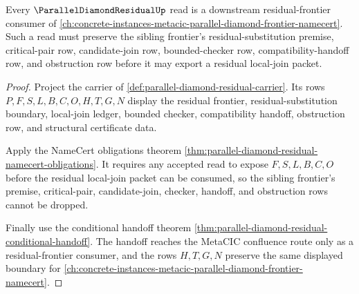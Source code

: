\begin{theorem}
\label{thm:parallel-diamond-residual-metacic-sibling-route}
Every $\ParallelDiamondResidualUp$ read is a downstream residual-frontier consumer of \autoref{ch:concrete-instances-metacic-parallel-diamond-frontier-namecert}. Such a read must preserve the sibling frontier's residual-substitution premise, critical-pair row, candidate-join row, bounded-checker row, compatibility-handoff row, and obstruction row before it may export a residual local-join packet.
\end{theorem}
\begin{proof}
Project the carrier of \autoref{def:parallel-diamond-residual-carrier}. Its rows $P,F,S,L,B,C,O,H,T,G,N$ display the residual frontier, residual-substitution boundary, local-join ledger, bounded checker, compatibility handoff, obstruction row, and structural certificate data.

Apply the NameCert obligations theorem \autoref{thm:parallel-diamond-residual-namecert-obligations}. It requires any accepted read to expose $F,S,L,B,C,O$ before the residual local-join packet can be consumed, so the sibling frontier's premise, critical-pair, candidate-join, checker, handoff, and obstruction rows cannot be dropped.

Finally use the conditional handoff theorem \autoref{thm:parallel-diamond-residual-conditional-handoff}. The handoff reaches the MetaCIC confluence route only as a residual-frontier consumer, and the rows $H,T,G,N$ preserve the same displayed boundary for \autoref{ch:concrete-instances-metacic-parallel-diamond-frontier-namecert}.
\end{proof}

